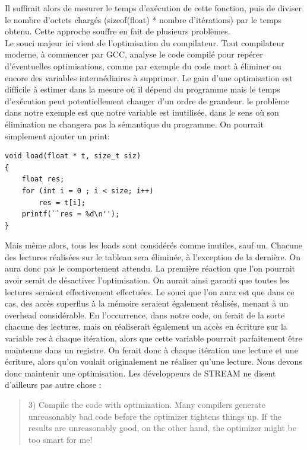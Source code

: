 \documentclass{report}
\begin{document}
Il suffirait alors de mesurer le temps d'exécution de cette fonction, puis de diviser le nombre d'octets
chargés (sizeof(float) * nombre d'itérations) par le temps obtenu.  Cette approche souffre en fait de 
plusieurs problèmes.
\\Le souci majeur ici vient de l'optimisation du compilateur. Tout compilateur moderne, à commencer
par GCC, analyse le code compilé pour repérer d'éventuelles optimisations, comme par exemple du 
code mort à éliminer ou encore des variables intermédiaires à supprimer. Le gain d'une optimisation
est difficile à estimer dans la mesure où il dépend du programme mais le temps d'exécution peut
potentiellement changer d'un ordre de grandeur. le problème dans notre exemple est que notre variable
est inutilisée, dans le sens où son élimination ne changera pas la sémantique du programme. On pourrait
simplement ajouter un print:
\begin{lstlisting}
void load(float * t, size_t siz)
{
    float res;
    for (int i = 0 ; i < size; i++)
        res = t[i]; 
    printf(``res = %d\n''); 
}
\end{lstlisting}

Mais même alors, tous les loads sont considérés comme inutiles, sauf un. Chacune des lectures réalisées
sur le tableau sera éliminée, à l'exception de la dernière. On aura donc pas le comportement attendu.
La première réaction que l'on pourrait avoir serait de désactiver l'optimisation. On aurait ainsi 
garanti que toutes les lectures seraient effectivement effectuées. Le souci que l'on aura est que dans
ce cas, des accès superflus à la mémoire seraient également réalisés, menant à un overhead considérable.
En l'occurrence, dans notre code, on ferait de la sorte chacune des lectures, mais on réaliserait 
également un accès en écriture sur la variable res à chaque itération, alors que cette variable pourrait
parfaitement être maintenue dans un registre. On ferait donc à chaque itération une lecture et une
écriture, alors qu'on voulait originalement ne réaliser qu'une lecture. Nous devons donc maintenir
une optimisation. Les développeurs de STREAM ne disent d'ailleurs pas autre chose :

\begin{quote}
 	3) Compile the code with optimization.  Many compilers generate
        unreasonably bad code before the optimizer tightens things up.  
      If the results are unreasonably good, on the other hand, the
        optimizer might be too smart for me!
\end{quote}
\end{document}
